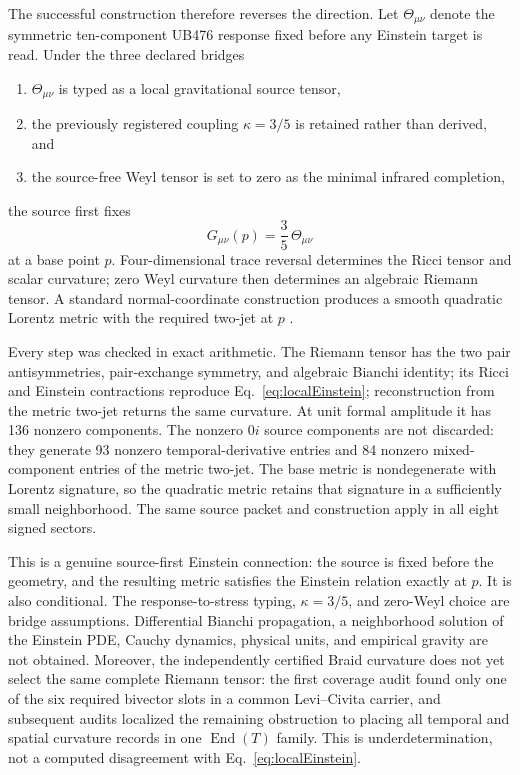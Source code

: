 \documentclass[11pt]{article}
\theoremstyle{definition}
\theoremstyle{remark}
\begin{document}
The successful construction therefore reverses the direction. Let $\Theta_{\mu\nu}$ denote the symmetric ten-component UB476 response fixed before any Einstein target is read. Under the three declared bridges
\begin{enumerate}[label=(\roman*)]
\item $\Theta_{\mu\nu}$ is typed as a local gravitational source tensor,
\item the previously registered coupling $\kappa=3/5$ is retained rather than derived, and
\item the source-free Weyl tensor is set to zero as the minimal infrared completion,
\end{enumerate}
the source first fixes
\begin{equation}\label{eq:localEinstein}
 G_{\mu\nu}(p)=\frac35\,\Theta_{\mu\nu}
\end{equation}
at a base point $p$. Four-dimensional trace reversal determines the Ricci tensor and scalar curvature; zero Weyl curvature then determines an algebraic Riemann tensor. A standard normal-coordinate construction produces a smooth quadratic Lorentz metric with the required two-jet at $p$ \cite{wald1984}.

Every step was checked in exact arithmetic. The Riemann tensor has the two pair antisymmetries, pair-exchange symmetry, and algebraic Bianchi identity; its Ricci and Einstein contractions reproduce Eq.~\eqref{eq:localEinstein}; reconstruction from the metric two-jet returns the same curvature. At unit formal amplitude it has 136 nonzero components. The nonzero $0i$ source components are not discarded: they generate 93 nonzero temporal-derivative entries and 84 nonzero mixed-component entries of the metric two-jet. The base metric is nondegenerate with Lorentz signature, so the quadratic metric retains that signature in a sufficiently small neighborhood. The same source packet and construction apply in all eight signed sectors.

This is a genuine source-first Einstein connection: the source is fixed before the geometry, and the resulting metric satisfies the Einstein relation exactly at $p$. It is also conditional. The response-to-stress typing, $\kappa=3/5$, and zero-Weyl choice are bridge assumptions. Differential Bianchi propagation, a neighborhood solution of the Einstein PDE, Cauchy dynamics, physical units, and empirical gravity are not obtained. Moreover, the independently certified Braid curvature does not yet select the same complete Riemann tensor: the first coverage audit found only one of the six required bivector slots in a common Levi--Civita carrier, and subsequent audits localized the remaining obstruction to placing all temporal and spatial curvature records in one $\operatorname{End}(T)$ family. This is underdetermination, not a computed disagreement with Eq.~\eqref{eq:localEinstein}.
\end{document}
